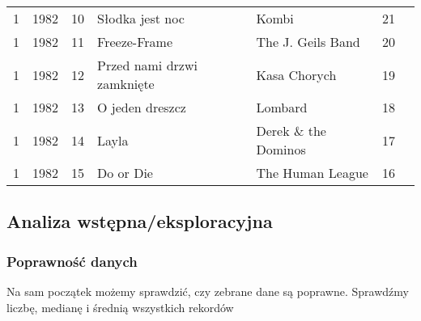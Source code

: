 \documentclass[11pt]{article}
\begin{document}
\begin{tabular}{r|llllll}
	 1                                       & 1982                                    & 10                                      & Słodka jest noc                         & Kombi                                   & 21                                     \\
	 1                                       & 1982                                    & 11                                      & Freeze-Frame                            & The J. Geils Band                       & 20                                     \\
	 1                                       & 1982                                    & 12                                      & Przed nami drzwi zamknięte              & Kasa Chorych                            & 19                                     \\
	 1                                       & 1982                                    & 13                                      & O jeden dreszcz                         & Lombard                                 & 18                                     \\
	 1                                       & 1982                                    & 14                                      & Layla                                   & Derek \& the Dominos                   & 17                                     \\
	 1                                       & 1982                                    & 15                                      & Do or Die                               & The Human League                        & 16                                     \\
\end{tabular}


    
    \hypertarget{analiza-wstux119pnaeksploracyjna}{%
\subsection{Analiza
wstępna/eksploracyjna}\label{analiza-wstux119pnaeksploracyjna}}

\hypertarget{poprawnoux15bux107-danych}{%
\subsubsection{Poprawność danych}\label{poprawnoux15bux107-danych}}

Na sam początek możemy sprawdzić, czy zebrane dane są poprawne.
Sprawdźmy liczbę, medianę i średnią wszystkich rekordów
\end{document}
